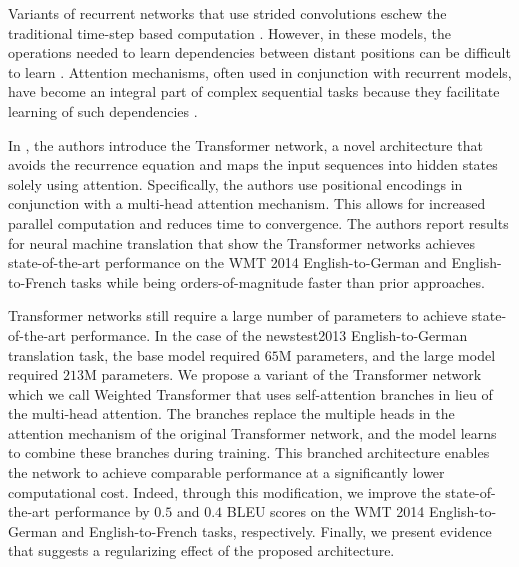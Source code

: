 \documentclass{article} %
\newcommand{\name}{Weighted Transformer\xspace}
\begin{document}
Variants of recurrent networks that use strided convolutions eschew the traditional time-step based computation \citep{kaiser2016can,lei2017training,bradbury2016quasi,gehring2016convenc,gehring2017convs2s,kalchbrenner2016neural}.  However, in these models, the operations needed to learn dependencies between distant positions can be difficult to learn \citep{hochreiter2001gradient,hochreiter1998vanishing}. Attention mechanisms, often used in conjunction with recurrent models, have become an integral part of complex sequential tasks because they facilitate learning of such dependencies \citep{luong2015effective,bahdanau2014neural,parikh2016decomposable,paulus2017deep,kim2017structured}.

In \citet{vaswani2017attention}, the authors introduce the Transformer network, a novel architecture that avoids the recurrence equation and maps the input sequences into hidden states solely using attention. Specifically, the authors use positional encodings in conjunction with a multi-head attention mechanism. This allows for increased parallel computation and reduces time to convergence. The authors report results for neural machine translation that show the Transformer networks achieves state-of-the-art performance on the WMT 2014 English-to-German and English-to-French tasks while being orders-of-magnitude faster than prior approaches. 

Transformer networks still require a large number of parameters to achieve state-of-the-art performance. In the case of the newstest2013 English-to-German translation task, the base model required $65$M parameters, and the large model required $213$M parameters. We propose a variant of the Transformer network which we call \name that uses self-attention branches in lieu of the multi-head attention. The branches replace the multiple heads in the attention mechanism of the original Transformer network, and the model learns to combine these branches during training. This branched architecture enables the network to achieve comparable performance at a significantly lower computational cost. Indeed, through this modification, we improve the state-of-the-art performance by $0.5$ and $0.4$ BLEU scores on the WMT 2014 English-to-German and English-to-French tasks, respectively. Finally, we present evidence that suggests a regularizing effect of the proposed architecture. 
\end{document}
